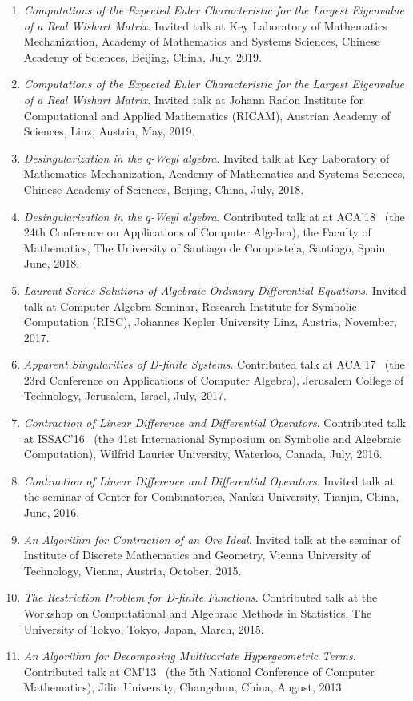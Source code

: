 \documentclass[a4paper,12pt]{article}
\begin{document}
\begin{enumerate}
\item {\em Computations of the Expected Euler Characteristic for the Largest Eigenvalue of a Real Wishart Matrix}.
Invited talk at Key Laboratory of Mathematics Mechanization, Academy of Mathematics and Systems Sciences,
 Chinese Academy of Sciences, Beijing, China, July, 2019. 
\item {\em Computations of the Expected Euler Characteristic for the Largest Eigenvalue of a Real Wishart Matrix}.
Invited talk at Johann Radon Institute for Computational and Applied Mathematics (RICAM), Austrian Academy of Sciences, Linz,
Austria, May, 2019.
 \item {\em Desingularization in the q-Weyl algebra}. 
 Invited talk at Key Laboratory of Mathematics Mechanization, Academy of Mathematics and Systems Sciences,
 Chinese Academy of Sciences, Beijing, China, July, 2018. 
 \item {\em Desingularization in the $q$-Weyl algebra}. 
 Contributed talk at at ACA'18 
 \ (the 24th Conference on Applications of Computer Algebra), the Faculty of Mathematics, 
 The University of Santiago de Compostela, Santiago, Spain, June, 2018.
 \item {\em Laurent Series Solutions of Algebraic Ordinary Differential Equations}. 
 Invited talk at Computer Algebra Seminar, Research Institute for Symbolic Computation (RISC), Johannes Kepler University Linz, 
 Austria, November, 2017.
 \item {\em Apparent Singularities of D-finite Systems}. Contributed talk at ACA'17 
 \ (the 23rd Conference on Applications of Computer Algebra), Jerusalem College of Technology, Jerusalem, Israel, July, 2017.
 \item {\em Contraction of Linear Difference and Differential Operators}. Contributed talk at ISSAC'16 
 \ (the 41st International Symposium on Symbolic and Algebraic Computation), Wilfrid Laurier University, Waterloo, Canada, July, 2016.
 \item {\em Contraction of Linear Difference and Differential Operators}.
       Invited talk at the seminar of Center for Combinatorics, Nankai University, Tianjin, China, June, 2016.
 \item {\em An Algorithm for Contraction of an Ore Ideal}. Invited talk at the seminar of Institute of Discrete Mathematics and Geometry, 
       Vienna University of Technology, Vienna, Austria, October, 2015.
 \item {\em The Restriction Problem for D-finite Functions}. 
       Contributed talk at the Workshop on Computational and Algebraic Methods in Statistics,
       The University of Tokyo, Tokyo, Japan, March, 2015.
 \item {\em An Algorithm for Decomposing Multivariate Hypergeometric Terms}. Contributed talk at CM'13
       \ (the 5th National Conference of Computer Mathematics), Jilin University, Changchun, China, August, 2013.
\end{enumerate}
\end{document}
